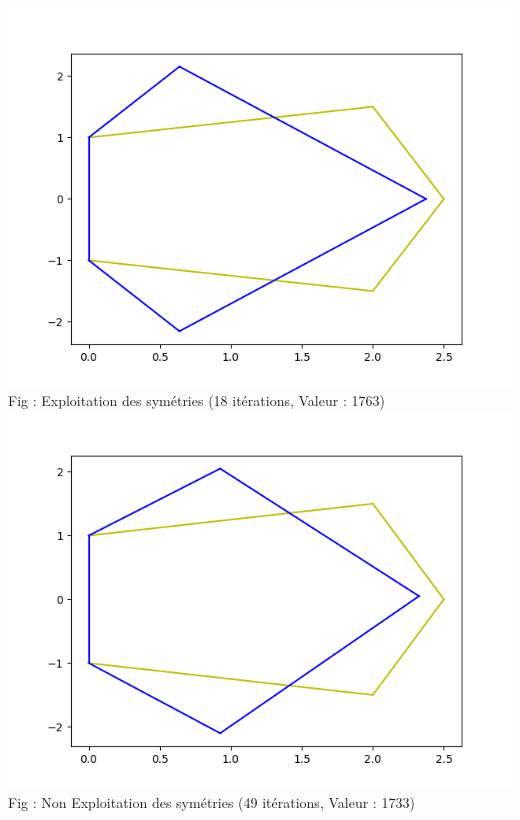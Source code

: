 \documentclass[a4paper,reqno]{article}
\begin{document}
\begin{center}
	\includegraphics[scale=0.45]{symetrieAlgo.png}\\
	Fig : Exploitation des symétries (18 itérations, Valeur : 1763)\\
	\includegraphics[scale=0.45]{comp3.png}\\
	Fig : Non Exploitation des symétries (49 itérations, Valeur : 1733)

\end{center}
\end{document}
